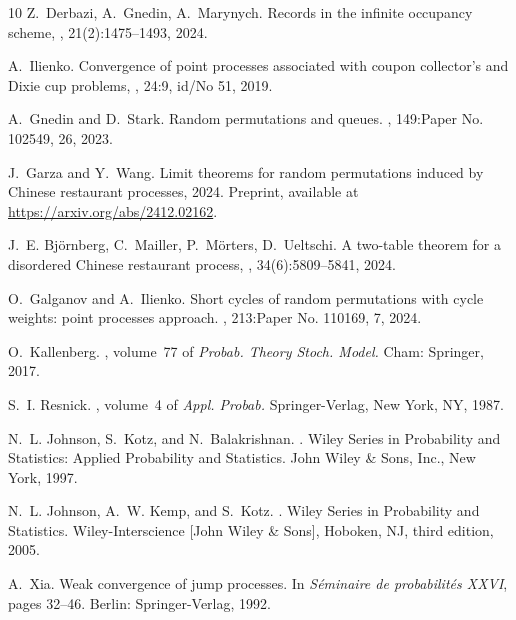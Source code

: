 \documentclass[11pt]{article}
\newcommand{\1}[1][]{
	\ifx&#1&\mathds{1}
	\else\mathds{1}\left\{#1\right\}\fi}
\theoremstyle{definition}
\theoremstyle{remark}
\numberwithin{equation}{section}
\begin{document}
\begin{thebibliography}{10}
		Z.~Derbazi, A.~Gnedin, A.~Marynych.
		\newblock Records in the infinite occupancy scheme,
		, 21(2):1475--1493, 2024.

		A.~Ilienko.
		\newblock Convergence of point processes associated with coupon collector's
			and {Dixie} cup problems, 
		, 24:9, id/No 51, 2019.

		A.~Gnedin and D.~Stark.
		\newblock Random permutations and queues.
		, 149:Paper No. 102549, 26, 2023.

		J.~Garza and Y.~Wang.
		\newblock Limit theorems for random permutations induced by {C}hinese
		restaurant processes, 2024.
		\newblock Preprint, available at \url{https://arxiv.org/abs/2412.02162}.

		J.~E. Bj{\"o}rnberg, C.~Mailler, P.~M{\"o}rters, D.~Ueltschi.
		\newblock A two-table theorem for a disordered {Chinese} restaurant process, 
		, 34(6):5809--5841, 2024.

		O.~Galganov and A.~Ilienko.
		\newblock Short cycles of random permutations with cycle weights: point
		processes approach.
		, 213:Paper No. 110169, 7, 2024.

		O.~Kallenberg.
		, volume~77 of {\em
			Probab. Theory Stoch. Model.}
		\newblock Cham: Springer, 2017.
		
		S.~I. Resnick.
		,
		volume~4 of {\em Appl. Probab.}
		\newblock Springer-Verlag, New York, NY, 1987.

		N.~L. Johnson, S.~Kotz, and N.~Balakrishnan.
		.
		\newblock Wiley Series in Probability and Statistics: Applied Probability and
		Statistics. John Wiley \& Sons, Inc., New York, 1997.

		N.~L. Johnson, A.~W. Kemp, and S.~Kotz.
		.
		\newblock Wiley Series in Probability and Statistics. Wiley-Interscience [John
		Wiley \& Sons], Hoboken, NJ, third edition, 2005.

		A.~Xia.
		\newblock Weak convergence of jump processes.
		\newblock In {\em S\'eminaire de probabilit\'es XXVI}, pages 32--46. Berlin:
		Springer-Verlag, 1992.
		

\end{thebibliography}
\end{document}
